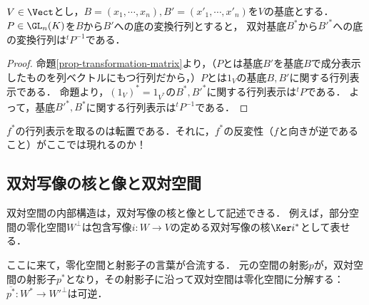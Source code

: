 \documentclass[uplatex, dvipdfmx]{jsreport}
\begin{document}
\begin{corollary}
    $V\in\Vect$とし，$B=(x_1,\cdots,x_n),B'=(x'_1,\cdots,x'_n)$を$V$の基底とする．$P\in\GL_n(K)$を$B$から$B'$への底の変換行列とすると，
    双対基底$B^*$から$B'^*$への底の変換行列は${}^tP^{-1}$である．
\end{corollary}
\begin{proof}
    命題\ref{prop-transformation-matrix}より，（$P$とは基底$B'$を基底$B$で成分表示したものを列ベクトルにもつ行列だから，）$P$とは$1_V$の基底$B,B'$に関する行列表示である．
    命題より，$(1_V)^*=1_{V^*}$の$B^*,B'^*$に関する行列表示は${}^t\!P$である．
    よって，基底$B'^*,B^*$に関する行列表示は${}^t\!P^{-1}$である．
\end{proof}
\begin{remark}
    $f^*$の行列表示を取るのは転置である．それに，$f^*$の反変性（$f$と向きが逆であること）がここでは現れるのか！
\end{remark}

\subsection{双対写像の核と像と双対空間}

\begin{tcolorbox}[colframe=ForestGreen, colback=ForestGreen!10!white, breakable,
    title=双対写像と零化空間を結びつける射影子$p^*$の双対写像としての構成]
    双対空間の内部構造は，双対写像の核と像として記述できる．
    例えば，部分空間の零化空間$W^\bot$は包含写像$i:W\to V$の定める双対写像の核$\Ker i^*$として表せる．

    ここに来て，零化空間と射影子の言葉が合流する．
    元の空間の射影$p$が，双対空間の射影子$p^*$となり，その射影子に沿って双対空間は零化空間に分解する：$\overline{p^*}:W^*\to W'^\bot$は可逆．
\end{tcolorbox}
\end{document}
